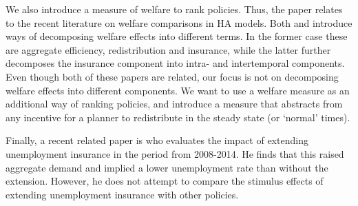 \documentclass[../HAFiscal]{subfiles}
\begin{document}
We also introduce a measure of welfare to rank policies. Thus, the paper relates to the recent literature on welfare comparisons in HA models. Both \cite{bhandari2021efficiency} and \cite{davila2022welfare} introduce ways of decomposing welfare effects into different terms. In the former case these are aggregate efficiency, redistribution and insurance, while the latter further decomposes the insurance component into intra- and intertemporal components. Even though both of these papers are related, our focus is not on decomposing welfare effects into different components. We want to use a welfare measure as an additional way of ranking policies, and introduce a measure that abstracts from any incentive for a planner to redistribute in the steady state (or `normal' times).

Finally, a recent related paper is \cite{kekre2022unemployment} who evaluates the impact of extending unemployment insurance in the period from 2008-2014. He finds that this raised aggregate demand and implied a lower unemployment rate than without the extension. However, he does not attempt to compare the stimulus effects of extending unemployment insurance with other policies. 
\end{document}
